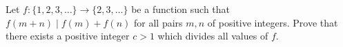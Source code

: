 Let $f:\{1,2,3,\ldots\}\to\{2,3,\ldots\}$ be a function such that $f(m+n)\mid f(m)+f(n)$ for all pairs $m,n$ of positive integers. Prove that there exists a positive integer $c>1$ which divides all values of $f$.

